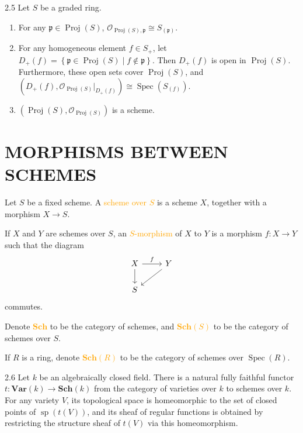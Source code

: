 \begin{proposition}{2.5}
	Let $S$ be a graded ring.
	\begin{enumerate}[label=\textup{(\alph*)},ref=\thepropositiontemp(\alph*)]
		\item\label{2.5.1} For any $\mathfrak{p}\in\operatorname{Proj}(S)$, $\mathcal{O}_{\operatorname{Proj}(S),\mathfrak{p}}\cong S_{(\mathfrak{p})}$.
		\item\label{2.5.2} For any homogeneous element $f\in S_+$, let $D_+(f)=\left\{\mathfrak{p}\in\operatorname{Proj}(S)\mid f\notin\mathfrak{p}\right\}$. Then $D_+(f)$ is open in $\operatorname{Proj}(S)$. Furthermore, these open sets cover $\operatorname{Proj}(S)$, and $\left(D_+(f),\mathcal{O}_{\operatorname{Proj}(S)}|_{D_+(f)}\right)\cong\operatorname{Spec}\!\left(S_{(f)}\right)$.
		\item\label{2.5.3} $\left(\operatorname{Proj}(S),\mathcal{O}_{\operatorname{Proj}(S)}\right)$ is a scheme.
	\end{enumerate}
\end{proposition}

\section*{MORPHISMS BETWEEN SCHEMES}

\begin{definition}
	Let $S$ be a fixed scheme. A \textcolor{orange}{scheme over $S$} is a scheme $X$, together with a morphism $X\rightarrow S$.
	
	If $X$ and $Y$ are schemes over $S$, an \textcolor{orange}{$S$-morphism} of $X$ to $Y$ is a morphism $f:X\rightarrow Y$ such that the diagram
	\begin{equation*}
		\begin{tikzcd}
			X\arrow[r,"f"]\arrow[d]&Y\arrow[ld]\\
			S
		\end{tikzcd}
	\end{equation*}
	commutes.
	
	Denote \textcolor{orange}{$\mathbf{Sch}$} to be the category of schemes, and \textcolor{orange}{$\mathbf{Sch}(S)$} to be the category of schemes over $S$.
	
	If $R$ is a ring, denote \textcolor{orange}{$\mathbf{Sch}(R)$} to be the category of schemes over $\operatorname{Spec}(R)$.
\end{definition}

\begin{proposition}{2.6}
	Let $k$ be an algebraically closed field. There is a natural fully faithful functor $t:\mathbf{Var}(k)\rightarrow\mathbf{Sch}(k)$ from the category of varieties over $k$ to schemes over $k$. For any variety $V$, its topological space is homeomorphic to the set of closed points of $\operatorname{sp}(t(V))$, and its sheaf of regular functions is obtained by restricting the structure sheaf of $t(V)$ via this homeomorphism.
\end{proposition}

